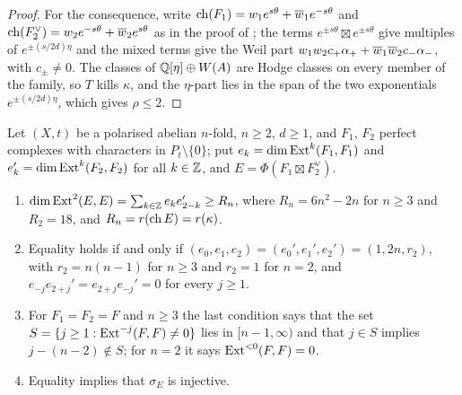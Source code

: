 \begin{proof}
For the consequence, write
$\operatorname{ch}(F_{1})=w_{1}e^{s\theta}+\overline{w}_{1}e^{-s\theta}$ and
$\operatorname{ch}(F_{2}^{\vee})=w_{2}e^{-s\theta}+\overline{w}_{2}e^{s\theta}$ as in the proof of
; the terms $e^{\pm s\theta}\boxtimes e^{\pm s\theta}$
give multiples of $e^{\pm(s/2d)\eta}$ and the mixed terms give the Weil part
$w_{1}w_{2}c_{+}\alpha_{+}+\overline{w}_{1}\overline{w}_{2}c_{-}\alpha_{-}$, with
$c_{\pm}\ne0$. The classes of $\mathbb{Q}[\eta]\oplus W(A)$ are Hodge classes on
every member of the family, so $T$ kills $\kappa$, and the $\eta$-part lies in
the span of the two exponentials $e^{\pm(s/2d)\eta}$, which gives $\rho\le2$.
\end{proof}

\begin{proposition}
\label{prop:orlovequality}
Let $(X,t)$ be a polarised abelian $n$-fold, $n\ge2$, $d\ge1$, and $F_{1}$,
$F_{2}$ perfect complexes with characters in $P_{t}\setminus\{0\}$; put
$e_{k}=\dim\operatorname{Ext}^{k}(F_{1},F_{1})$ and $e_{k}'=\dim\operatorname{Ext}^{k}(F_{2},F_{2})$ for all
$k\in\mathbb{Z}$, and $E=\Phi(F_{1}\boxtimes F_{2}^{\vee})$.
\begin{enumerate}[label=\textup{(\roman*)},leftmargin=2.6em,itemsep=2pt]
\item $\dim\operatorname{Ext}^{2}(E,E)=\sum_{k\in\mathbb{Z}}e_{k}e_{2-k}'\ge R_{n}$, where
  $R_{n}=6n^{2}-2n$ for $n\ge3$ and $R_{2}=18$, and $R_{n}=r(\operatorname{ch} E)=r(\kappa)$.
\item Equality holds if and only if $(e_{0},e_{1},e_{2})=(e_{0}',e_{1}',e_{2}')
  =(1,2n,r_{2})$, with $r_{2}=n(n-1)$ for $n\ge3$ and $r_{2}=1$ for $n=2$, and
  $e_{-j}e_{2+j}'=e_{2+j}e_{-j}'=0$ for every $j\ge1$.
\item For $F_{1}=F_{2}=F$ and $n\ge3$ the last condition says that the set
  $S=\{j\ge1:\operatorname{Ext}^{-j}(F,F)\ne0\}$ lies in $[n-1,\infty)$ and that $j\in S$
  implies $j-(n-2)\notin S$; for $n=2$ it says $\operatorname{Ext}^{<0}(F,F)=0$.
\item Equality implies that $\sigma_{E}$ is injective.
\end{enumerate}
\end{proposition}

